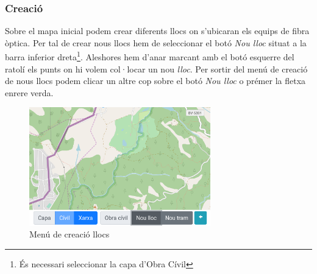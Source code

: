 \documentclass[a4paper]{article}
\begin{document}
	\subsubsection{Creació}
	Sobre el mapa inicial podem crear diferents llocs on s'ubicaran els equips de fibra òptica. Per tal de crear nous llocs hem de seleccionar el botó \emph{Nou lloc} situat a la barra inferior dreta\footnote{És necessari seleccionar la capa d'Obra Cívil}. Aleshores hem d'anar marcant amb el botó esquerre del ratolí els punts on hi volem col·locar un nou \emph{lloc}. Per sortir del menú de creació de nous llocs podem clicar un altre cop sobre el botó \emph{Nou \emph{lloc}} o prémer la fletxa enrere verda.
	
	\begin{figure}[H]
		\centering
		\includegraphics[width=0.7\textwidth]{images/newsite_menu.png}
		\caption{Menú de creació llocs}
		\label{fig:newsite-menu}
	\end{figure}
	
\end{document}
